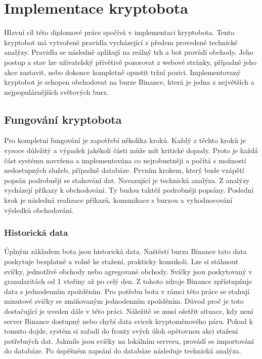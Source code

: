 \chapter{Implementace kryptobota}
\label{chap:impl}


Hlavní cíl této diplomové práce spočívá v implementaci kryptobota. Tento kryptobot má vytvořené pravidla vycházející z předem provedené technické analýzy.
Pravidla se následně aplikují na reálný trh a bot provádí obchody. Jeho postup a stav lze uživatelský přivětivě pozorovat z webové stránky, případně jeho akce
zastavit, nebo dokonce kompletně opustit tržní pozici. Implementovaný kryptobot je schopen obchodovat na burze Binance, která je jedna z největších a nejpopulárnějších
světových burz.


\section{Fungování kryptobota}
Pro kompletní fungování je zapotřebí několika kroků. Každý z těchto kroků je vysoce důležitý a výpadek jakékoli části může mít kritické dopady. Proto je každá část systému navržena
a implementována co nejrobustněji a počítá s možností nedostupných služeb, případně databáze. Prvním krokem, který bude vzápětí popsán podrobněji se stahování dat. Navazující
je technická analýza. Z analýzy vycházejí příkazy k obchodování. Ty budou taktéž podrobněji popsány. Poslední krok je následná realizace příkazů, komunikace s burzou
a vyhodnocování výsledků obchodování.

\subsection{Historická data}
Úplným základem bota jsou historická data. Naštěstí burza Binance tato data poskytuje bezplatně a volně ke stažení, prakticky komukoli. Lze si stáhnout svíčky,
jednotlivé obchody nebo agregované obchody. Svíčky jsou poskytovaný v granularitách od 1 vteřiny až po celý den. Z tohoto zdroje Binance zpřístupňuje data s jednodenním
zpožděním. Pro potřebu bota v rámci této práce se stahují minutové svíčky se zmiňovaným jednodenním zpožděním. Důvod proč je toto dostačující je uveden dále v této práci.
Náležitě se musí ošetřit situace, kdy není server Binance dostupný nebo chybí data svicek kryptoměnového páru. Pokud k tomuto dojde, systém si zařadí do fronty svých úloh opětovnou
akci stažení potřebných dat. Jakmile jsou svíčky na lokálním serveru, provádí se importování do databáze. Po úspěšném zapsání do databáze následuje technická analýza.

